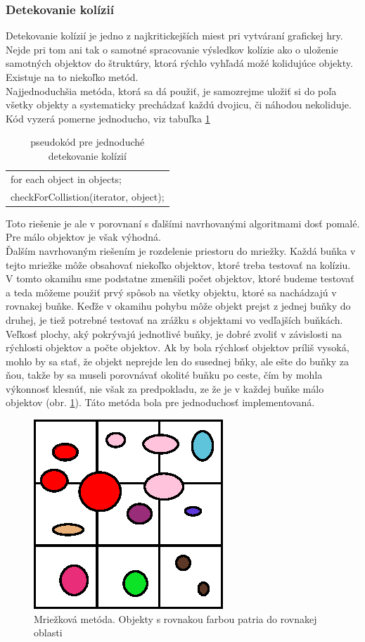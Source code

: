 \subsubsection{Detekovanie kolízií}
Detekovanie kolízií je jedno z najkritickejších miest pri vytváraní grafickej hry. Nejde pri tom ani tak o samotné spracovanie výsledkov kolízie ako o uloženie samotných objektov do štruktúry, ktorá rýchlo vyhľadá možé kolidujúce objekty. Existuje na to niekoľko metód.\\
Najjednoduchšia metóda, ktorá sa dá použiť, je samozrejme uložiť si do poľa všetky objekty a systematicky prechádzať každú dvojicu, či náhodou nekoliduje. Kód vyzerá pomerne jednoducho, viz tabuľka \ref{tab:k1} \\
\begin{table}
\centering
\begin{tabular}{|l|}
\hline
for each object in objects;\\
checkForCollistion(iterator, object);\\
\hline
\end{tabular}
\caption{pseudokód pre jednoduché detekovanie kolízií}
\label{tab:k1}
\end{table}
Toto riešenie je ale v porovnaní s ďalšími navrhovanými algoritmami dosť pomalé. Pre málo objektov je však výhodná.\\
\indent Ďalším navrhovaným riešením je rozdelenie priestoru do mriežky. Každá buňka v tejto mriežke môže obsahovať niekoľko objektov, ktoré treba testovať na kolíziu. V tomto okamihu sme podstatne zmenšili počet objektov, ktoré budeme testovať a teda môžeme použiť prvý spôsob na všetky objektu, ktoré sa nachádzajú v rovnakej buňke. Keďže v okamihu pohybu môže objekt prejst z jednej buňky do druhej, je tiež potrebné testovať na zrážku s objektami vo vedľajších buňkách. Veľkosť plochy, aký pokrývajú jednotlivé buňky, je dobré zvoliť v závislosti na rýchlosti objektov a počte objektov. Ak by bola rýchlosť objektov príliš vysoká, mohlo by sa stať, že objekt neprejde len do susednej bňky, ale ešte do buňky za ňou, takže by sa museli porovnávať okolité buňku po ceste, čím by mohla výkonnosť klesnúť, nie však za predpokladu, ze že je v každej buňke málo objektov (obr. \ref{fig:hash}). Táto metóda bola pre jednoduchosť implementovaná.\\%
\begin{figure}
\centering
	\includegraphics[totalheight=0.2\textheight,width=.2\textwidth]{mriezka}
\caption { Mriežková metóda. Objekty s rovnakou farbou patria do rovnakej oblasti}
\label{fig:hash}
\end{figure}
